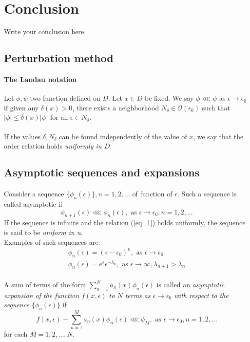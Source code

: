 \documentclass{article}
\begin{document}
\section{Conclusion}
%
Write your conclusion here.
%
\begin{appendices}
%
\section{Perturbation method}
%
\paragraph{The Landau notation} Let $\phi, \psi$ two function defined on $D$. Let $x\in D$ be fixed. We say $\phi\lll\psi$ as $\epsilon\rightarrow\epsilon_0$ if given any $\delta(x)>0$, there exists a neighborhood $N_\delta\in\mathcal O(\epsilon_0)$ such that $|\phi|\leq\delta(x)|\psi|$ for all $\epsilon\in N_\delta$.
\paragraph{} If the values $\delta, N_\delta$ can be found independently of the value of $x$, we say that the order relation holds \emph{uniformly in $D$}.
%
\subsection{Asymptotic sequences and expansions}
\paragraph{} Consider a sequence $\{\phi_n(\epsilon)\}, n=1, 2, \ldots$ of function of $\epsilon$. Such a sequence is called asymptotic if
%
\begin{equation}
%
\phi_{n+1}(\epsilon) \lll \phi_n(\epsilon), \textrm{ as } \epsilon\rightarrow\epsilon_0, n=1, 2, \ldots\label{eq_1}
%
\end{equation}
%
If the sequence is infinite and the relation (\ref{eq_1}) holds uniformly, the sequence is said to be \emph{uniform in n}.\\
%
Examples of such sequences are:
%
\begin{eqnarray}
%
\phi_n(\epsilon) = (\epsilon-\epsilon_0)^n, \textrm{ as } \epsilon\rightarrow\epsilon_0\\
\phi_n(\epsilon) = e^\epsilon\epsilon^{-\lambda_n}, \textrm{ as } \epsilon\rightarrow\infty, \lambda_{n+1} > \lambda_n
%
\end{eqnarray}
%
\paragraph{} A sum of terms of the form $\sum^N_{n=1}a_n(x)\phi_n(\epsilon)$ is called an \emph{asymptotic expansion of the function $f(x, \epsilon)$ to $N$ terms as $\epsilon\rightarrow\epsilon_0$ with respect to the sequence $\{\phi_n(\epsilon)\}$} if 
%
\begin{equation}
%
f(x, \epsilon) - \sum^M_{n=1}a_n(x)\phi_n(\epsilon) \lll \phi_M, \textrm{ as } \epsilon\rightarrow\epsilon_0, n=1, 2, \ldots\label{eq_a_1}
%
\end{equation}
%
for each $M=1, 2, \ldots, N$.
%

\end{appendices}
\end{document}
